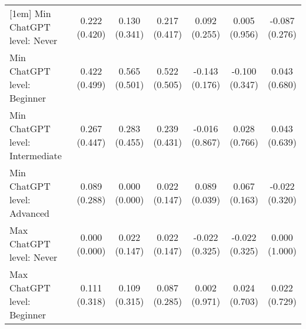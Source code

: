 \begin{table}[ht]
{\begin{tabular}{lcccccc}
[1em]
Min ChatGPT level: Never & \shortstack{0.222\\(0.420)} & \shortstack{0.130\\(0.341)} & \shortstack{0.217\\(0.417)} & \shortstack{0.092\\(0.255)} & \shortstack{0.005\\(0.956)} & \shortstack{-0.087\\(0.276)}\\
[1em]
Min ChatGPT level: Beginner & \shortstack{0.422\\(0.499)} & \shortstack{0.565\\(0.501)} & \shortstack{0.522\\(0.505)} & \shortstack{-0.143\\(0.176)} & \shortstack{-0.100\\(0.347)} & \shortstack{0.043\\(0.680)}\\
[1em]
Min ChatGPT level: Intermediate & \shortstack{0.267\\(0.447)} & \shortstack{0.283\\(0.455)} & \shortstack{0.239\\(0.431)} & \shortstack{-0.016\\(0.867)} & \shortstack{0.028\\(0.766)} & \shortstack{0.043\\(0.639)}\\
[1em]
Min ChatGPT level: Advanced & \shortstack{0.089\\(0.288)} & \shortstack{0.000\\(0.000)} & \shortstack{0.022\\(0.147)} & \shortstack{0.089\\(0.039)} & \shortstack{0.067\\(0.163)} & \shortstack{-0.022\\(0.320)}\\
[1em]
Max ChatGPT level: Never & \shortstack{0.000\\(0.000)} & \shortstack{0.022\\(0.147)} & \shortstack{0.022\\(0.147)} & \shortstack{-0.022\\(0.325)} & \shortstack{-0.022\\(0.325)} & \shortstack{0.000\\(1.000)}\\
[1em]
Max ChatGPT level: Beginner & \shortstack{0.111\\(0.318)} & \shortstack{0.109\\(0.315)} & \shortstack{0.087\\(0.285)} & \shortstack{0.002\\(0.971)} & \shortstack{0.024\\(0.703)} & \shortstack{0.022\\(0.729)}\\

\end{tabular}}
\end{table}
